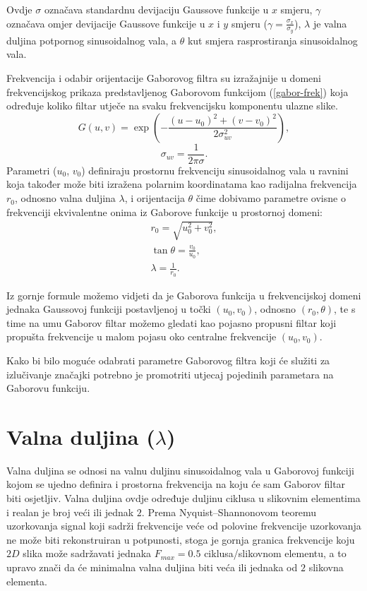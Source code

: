 \documentclass{ru}
\begin{document}
Ovdje $\sigma$ označava standardnu devijaciju Gaussove funkcije u $x$ smjeru,
$\gamma$ označava omjer devijacije Gaussove funkcije u $x$ i $y$ smjeru ($\gamma =
\frac{\sigma_x}{\sigma_y}$), $\lambda$ je valna duljina potpornog sinusoidalnog
vala, a $\theta$ kut smjera rasprostiranja sinusoidalnog vala.

Frekvencija i odabir orijentacije Gaborovog filtra su izražajnije u
domeni frekvencijskog prikaza predstavljenog Gaborovom funkcijom (\ref{gabor-frek}) koja
određuje koliko filtar utječe na svaku frekvencijsku komponentu ulazne slike.
\begin{equation}
G(u,v) = \exp \left ( - \frac{(u-u_0)^2 + (v-v_0)^2}{2\sigma^2_{uv}}\right ),
\label{gabor-frek}
\end{equation}
\begin{equation}
\sigma_{uv} = \frac{1}{2\pi \sigma}.
\end{equation}
Parametri ($u_0$, $v_0$) definiraju prostornu frekvenciju sinusoidalnog vala u
ravnini koja također može biti izražena polarnim koordinatama kao radijalna
frekvencija $r_0$, odnosno valna duljina $\lambda$, i orijentacija $\theta$ čime
dobivamo parametre ovisne o frekvenciji ekvivalentne onima iz Gaborove funkcije u prostornoj
domeni:
\begin{eqnarray}
r_0 = \sqrt{u_0^2 + v_0^2}, \\
\tan \theta = \frac{v_0}{u_0}, \\
\lambda = \frac{1}{r_0}.
\end{eqnarray}

Iz gornje formule možemo vidjeti da je Gaborova funkcija u frekvencijskoj domeni
jednaka Gaussovoj funkciji postavljenoj u točki $(u_0, v_0)$, odnosno $(r_0,
\theta)$, te s time na umu Gaborov filtar možemo gledati kao pojasno propusni
filtar koji propušta frekvencije u malom pojasu oko centralne frekvencije $(u_0,
v_0)$.

Kako bi bilo moguće odabrati parametre Gaborovog filtra koji će služiti
za izlučivanje značajki potrebno je promotriti utjecaj pojedinih parametara na
Gaborovu funkciju.

\section{Valna duljina ($\lambda$)}
Valna duljina se odnosi na valnu duljinu sinusoidalnog vala u Gaborovoj funkciji
kojom se ujedno definira i prostorna frekvencija na koju će sam Gaborov filtar
biti osjetljiv. Valna duljina ovdje određuje duljinu ciklusa u slikovnim
elementima  i realan je broj veći ili jednak $2$. Prema
Nyquist--Shannonovom teoremu uzorkovanja signal koji sadrži frekvencije veće od
polovine frekvencije uzorkovanja ne može biti rekonstruiran u potpunosti, stoga
je gornja granica frekvencije koju $2D$ slika može sadržavati jednaka $F_{max} =
0.5$ ciklusa/slikovnom elementu, a to upravo znači da će minimalna valna duljina
biti veća ili jednaka od $2$ slikovna elementa.
\end{document}
